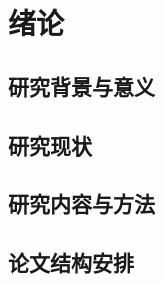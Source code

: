 
\chapter{绪论}\label{chap:introduction}

\section{研究背景与意义}\label{sec:background}

\section{研究现状}\label{sec:stateoftheart}
\cite{lamport1986document}

\section{研究内容与方法}\label{sec:methods}

\section{论文结构安排}\label{sec:structure}
